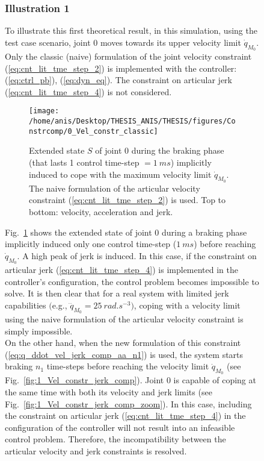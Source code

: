 \begin{figure}[!htbp]
\subsubsection{Illustration 1}
To illustrate this first theoretical result, in this simulation, using the test case scenario, joint $0$ moves towards its upper velocity limit $\dot{q}_{M_{0}}$. Only the classic (naive) formulation of the joint velocity constraint (\ref{eq:cnt_lit_tme_step_2}) is implemented with the controller: (\ref{eq:ctrl_pb}), (\ref{eq:dyn_eq}). The constraint on articular jerk (\ref{eq:cnt_lit_tme_step_4}) is not considered. 
\begin{figure}[!htbp]
\centering
{\texttt{[image: /home/anis/Desktop/THESIS\_ANIS/THESIS/figures/Constrcomp/0\_Vel\_constr\_classic]}}
\caption{Extended state $S$ of joint $0$ during the braking phase (that lasts 1 control time-step $= 1~ms$) implicitly induced to cope with the maximum velocity limit $\dot{q}_{M_{0}}$. The naive formulation of the articular velocity constraint (\ref{eq:cnt_lit_tme_step_2}) is used. Top to bottom: velocity, acceleration and jerk.} 
\label{fig:0_Vel_constr_classic}
\end{figure}
Fig.~\ref{fig:0_Vel_constr_classic} shows the extended state of joint $0$ during a braking phase implicitly induced only one control time-step ($1~ms$) before reaching $\dot{q}_{M_{0}}$. A high peak of jerk is induced. In this case, if the constraint on articular jerk (\ref{eq:cnt_lit_tme_step_4}) is implemented in the controller's configuration, the control problem becomes impossible to solve. It is then clear that for a real system with limited jerk capabilities $($e.g., $\dddot{q}_{M_{0}} = 25~rad.s^{-3})$, coping with a velocity limit using the naive formulation of the articular velocity constraint is simply impossible. \\
On the other hand, when the new formulation of this constraint (\ref{eq:q_ddot_vel_jerk_comp_aa_n1}) is used, the system starts braking $n_1$ time-steps before reaching the velocity limit $\dot{q}_{M_0}$ (see Fig.~\ref{fig:1_Vel_constr_jerk_comp}). Joint $0$ is capable of coping at the same time with both its velocity and jerk limits (see Fig.~\ref{fig:1_Vel_constr_jerk_comp_zoom}). In this case, including the constraint on articular jerk (\ref{eq:cnt_lit_tme_step_4}) in the configuration of the controller will not result into an infeasible control problem. Therefore, the incompatibility between the articular velocity and jerk constraints is resolved.
\begin{figure}[!htbp]

\end{figure}
\end{figure}
